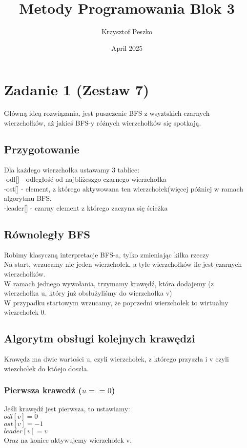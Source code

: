 \documentclass{article}
\title{Metody Programowania Blok 3}
\author{Krzysztof Peszko }
\date{April 2025}
\begin{document}
\maketitle

\section{Zadanie 1 (Zestaw 7)}
Główną ideą rozwiązania, jest puszczenie BFS z wsyztskich czarnych wierzchołków, aż jakieś BFS-y różnych wierzchołków się spotkają.
\subsection{ Przygotowanie}
Dla każdego wierzchołka ustawamy 3 tablice:
\\
-odl[] - odległość od najbliżeszgo czarnego wierzchołka
\\
-ost[] - element, z którego aktywowana ten wierzchołek(więcej póżniej w ramach algorytmu BFS.
\\
-leader[] - czarny element z którego zaczyna się ścieżka
\subsection{Równoległy BFS}
Robimy klasyczną interpretacje BFS-a, tylko zmieniając kilka rzeczy \\
Na start, wrzucamy nie jeden wierzchołek, a tyle wierzchołków ile jest czarnych wierzchołków. \\
W ramach jednego wywołania, trzymamy krawędź, która dodajemy (z wierzchołka u, który już obsłużyliśmy do wierzchołka v) \\
W przypadku startowym wrzucamy, że poprzedni wierzchołek to wirtualny wiezrchołek 0.
\subsection{Algorytm obsługi kolejnych krawędzi}
Krawędz ma dwie wartości u, czyli wierzchołek, z którego przyszła i v czyli wiezchołek do któejo doszła.
\subsubsection{Pierwsza krawedź ($u == 0$)}
Jeśli krawędź jest pierwsza, to ustawiamy: \\
$odl[v] = 0$ \\
$ost[v] = -1$ \\
$leader[v] = v$ \\
Oraz na koniec aktywujemy wierzchołek v.
\end{document}
